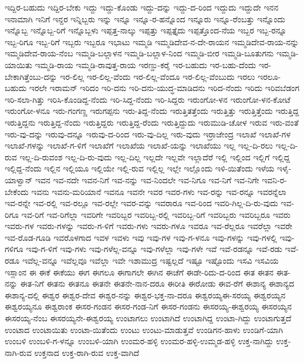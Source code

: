 {ಇದ್ದಿರ-ಬಹುದು
ಇದ್ದಿರ-ಬೇಕು
ಇದ್ದು
ಇದ್ದು-ಕೊಂಡು
ಇದ್ದು-ದನ್ನು
ಇದ್ದು-ದ-ರಿಂದ
ಇದ್ದುದು
ಇದ್ದುದೇ
ಇನನ
ಇನಾಮಾಗಿ
ಇನಿಗೆ
ಇನ್ದರ
ಇನ್ನಿಬ್ಬರು
ಇನ್ನು
ಇನ್ನೂ
ಇನ್ನೂ-ರ-ಹನ್ನೊಂದ
ಇನ್ನೂರು
ಇನ್ನೂ-ರೆಂಬತ್ತು
ಇನ್ನೊಂದು
ಇನ್ನೊಬ್ಬ
ಇನ್ನೊಬ್ಬ-ರಿಗೆ
ಇನ್ನೊಬ್ಬಳು
ಇಪ್ಪತ್ತ-ನಾಲ್ಕು
ಇಪ್ಪತ್ತು
ಇಪ್ಪತ್ತೈದು
ಇಪ್ಪತ್ತೊಂದ-ನೆಯ
ಇಬ್ಬರ
ಇಬ್ಬ-ರನ್ನೂ
ಇಬ್ಬ-ರಿಗೂ
ಇಬ್ಬ-ರಿಗೆ
ಇಬ್ಬರು
ಇಬ್ಬರೂ
ಇಭಾಟು
ಇಮ್ಮಡಿ
ಇಮ್ಮಡಿದೇವ-ನ-ದೇ-ರಾಯನ
ಇಮ್ಮಡಿದೇವ-ರಾಯ-ನನ್ನು
ಇಮ್ಮಡಿದೇವ-ರಾಯ-ನೆಂಬ
ಇಮ್ಮಡಿ-ಬಲ್ಲಾಳನ
ಇಮ್ಮಡಿ-ಬಲ್ಲಾಳ-ನಿಂದ
ಇಮ್ಮಡಿ-ಬೀರ
ಇಮ್ಮಡಿ-ಬೂತುಗನು
ಇಮ್ಮಡಿ-ಯಾಯಿತು
ಇಮ್ಮಡಿ-ರಾಯ
ಇಮ್ಮಡಿ-ರಾವುತ್ತ-ರಾಯ
ಇರಣ್ಡು-ಕರೈ
ಇರ-ಬಹುದು
ಇರ-ಬಹು-ದೆಂದು
ಇರ-ಬೇಕಾಗಿತ್ತೆಂಬು-ದನ್ನು
ಇರ-ಲಿಲ್ಲ
ಇರ-ಲಿಲ್ಲ-ವೆಂದು
ಇರ-ಲಿಲ್ಲ-ವೆಂದೂ
ಇರ-ಲಿಲ್ಲ-ವೆಂಬುದು
ಇರಲು
ಇರಲೂ-ಬಹುದು
ಇರಲೇ
ಇರಾಮನ್
ಇರಿದಂ
ಇರಿ-ದನು
ಇರಿ-ದನು-ಯುದ್ಧ-ಮಾಡಿದನು
ಇರಿದ-ನೆಂದು
ಇರಿದು
ಇರಿವಬೆಡಂಗ
ಇರಿ-ಸಲಾ-ಗಿತ್ತು
ಇರಿಸಿ-ಕೊಂಡಿದ್ದ-ನೆಂದು
ಇರಿ-ಸಿದ್ದ-ನೆಂದು
ಇರಿ-ಸಿದ್ದರು
ಇರುಂಗೋ-ಳನ
ಇರುಂಗೋ-ಳನ-ಕೋಟೆ
ಇರುಂಗೋ-ಳನೂ
ಇರು-ಗಂಗಣ್ಣ
ಇರುಗಪ್ಪನು
ಇರು-ತಿದ್ದ-ನೆಂದು
ಇರುತ್ತಿತತ್ತೆಂದು
ಇರುತ್ತಿತ್ತು
ಇರುತ್ತಿತ್ತೆಂದು
ಇರುತ್ತಿದ್ದ
ಇರುತ್ತಿದ್ದನು
ಇರುತ್ತಿದ್ದ-ನೆಂದು
ಇರುತ್ತಿದ್ದರು
ಇರುತ್ತಿದ್ದ-ರೆಂದು
ಇರುತ್ತಿದ್ದುದು
ಇರುಮುಡಿ-ಚೋಳ
ಇರುವ
ಇರು-ವಂತೆ
ಇರು-ವು-ದನ್ನು
ಇರುವು-ದನ್ನೂ
ಇರುವು-ದ-ರಿಂದ
ಇರು-ವು-ದಿಲ್ಲ
ಇರು-ವುದು
ಇರ್ರಾಜೇಂದ್ರ
ಇಲಾಖೆ
ಇಲಾಖೆ-ಗಳ
ಇಲಾಖೆ-ಗಳನ್ನು
ಇಲಾಖೆ-ಗ-ಳಿಗೆ
ಇಲಾಖೆಗೆ
ಇಲಾಖೆಯ
ಇಲಾಖೆ-ಯನ್ನು
ಇಲಾಖೆಯು
ಇಲ್ಲ
ಇಲ್ಲ-ದಿ-ರಲು
ಇಲ್ಲ-ದಿ-ರುವ
ಇಲ್ಲ-ದಿ-ರುವಂಶ
ಇಲ್ಲ-ದಿ-ರು-ವುದು
ಇಲ್ಲ-ದಿಲ್ಲ
ಇಲ್ಲದೇ
ಇಲ್ಲವೇ
ಇಲ್ಲಾದೆರೆ
ಇಲ್ಲಿ
ಇಲ್ಲಿಂದ
ಇಲ್ಲಿಗೆ
ಇಲ್ಲಿದ್ದ
ಇಲ್ಲಿದ್ದ-ನೆಂದು
ಇಲ್ಲಿನ
ಇಲ್ಲಿಯೂ
ಇಲ್ಲಿಯೇ
ಇಲ್ಲಿ-ರುವ
ಇಲ್ಲಿಲ್ಲ
ಇಲ್ಲೇ
ಇಲ್ಲೊಂದು
ಇಳಿ-ಯಿತೆಂದು
ಇಳೆಯ
ಇಳೈ-ಯಾಳ್ವಾನ್
ಇವನ
ಇವ-ನದೇ
ಇವನ-ನಿಗೆ
ಇವ-ನನ್ನು
ಇವ-ನಿಂದಲೇ
ಇವ-ನಿಗೂ
ಇವ-ನಿಗೆ
ಇವ-ನಿಗೇ
ಇವನಿ-ರ-ಬೇಕೆಂದು
ಇವನು
ಇವನು-ಮರಿಯಾನೆ
ಇವನೂ
ಇವನೇ
ಇವರ
ಇವರ-ಗಳು
ಇವ-ರನ್ನು
ಇವ-ರನ್ನೂ
ಇವರನ್ನೆಲಾ
ಇವ-ರನ್ನೇ
ಇವ-ರಲ್ಲಿ
ಇವ-ರಲ್ಲೂ
ಇವ-ರಲ್ಲೇ
ಇವರ-ವನ್ನು
ಇವರಾರೂ
ಇವ-ರಿಂದ
ಇವರಿ-ಗಿಲ್ಲ-ದಿ-ರು-ವುದು
ಇವ-ರಿಗೂ
ಇವ-ರಿಗೆ
ಇವ-ರಿಗೆಲ್ಲಾ
ಇವರಿಗೇ
ಇವರಿಬ್ಬರ
ಇವರಿಬ್ಬ-ರಲ್ಲಿ
ಇವರಿಬ್ಬ-ರಿಗೆ
ಇವರಿಬ್ಬರು
ಇವರಿಬ್ಬರೂ
ಇವರು
ಇವರು-ಗಳ
ಇವರು-ಗಳನ್ನು
ಇವರು-ಗ-ಳಿಗೆ
ಇವರು-ಗಳು
ಇವರು-ಗಳೂ
ಇವರೂ
ಇವ-ರೆಲ್ಲರೂ
ಇವರೆಲ್ಲಾ
ಇವರೇ
ಇವ-ರೊಡ-ಗೂಡಿ
ಇವರೊಳಗಾದ
ಇವಳ
ಇವಳು
ಇವು
ಇವು-ಗಳ
ಇವು-ಗ-ಳನೂ
ಇವು-ಗಳನ್ನು
ಇವು-ಗಳಲ್ಲಿ
ಇವು-ಗಳಿಗೂ
ಇವು-ಗ-ಳಿಗೆ
ಇವು-ಗಳು
ಇವು-ಗಳೆಲ್ಲ-ವನ್ನೂ
ಇವು-ಗಳೆಲ್ಲಾ
ಇವು-ಗಳೇ
ಇವೆ
ಇವೆ-ರಡನ್ನೂ
ಇವೆ-ರಡು
ಇವೆ-ರಡೂ
ಇವೆಲ್ಲ-ವನ್ನೂ
ಇವೆಲ್ಲವೂ
ಇವೆಲ್ಲಾ
ಇವೇ
ಇಶಾಮುದ್ರ
ಇಷ್ಟಲ್ಲದೆ
ಇಷ್ಟೂ
ಇಷ್ಟೊಂದು
ಇಸವಿ
ಇಸವಿಯ
ಇಸ್ಲಾಂನ
ಈ
ಈಕೆ
ಈಕೆಯು
ಈಗ
ಈಗಲೂ
ಈಗಾಗಲೇ
ಈಗಿನ
ಈಚೆಗೆ
ಈಡೇ-ರಿದು-ದ-ರಿಂದ
ಈತ
ಈತನ
ಈತ-ನನ್ನು
ಈತ-ನಿಗೆ
ಈತನು
ಈತನೂ
ಈತನೇ
ಈತನೇ-ನಾನ-ದರೂ
ಈರೀತಿ
ಈರೋಡು
ಈವ-ರೆಗೆ
ಈಶಾನ್ಯ
ಈಶಾನ್ಯದ
ಈಶಾನ್ಯ-ದಲ್ಲಿ
ಈಶ್ವರ
ಈಶ್ವರ-ದೇವ
ಈಶ್ವರ-ನನ್ನು
ಈಶ್ವರ-ಭಕ್ತ-ನಾ-ದರೂ
ಈಶ್ವರಯ್ಯಈ-ಸರಯ್ಯ
ಈಶ್ವರಯ್ಯನ
ಈಶ್ವರಯ್ಯನೂ
ಈಶ್ವರಾಂಕ
ಈಸರ-ಗಂಡನ
ಈಸರ-ಗಂಡ-ನಿಗೆ
ಈಸರ-ಗಂಡನು
ಈಸರಯ್ಯ-ಈಶ್ವರಯ್ಯ
ಈಸರಯ್ಯನ
ಈಸರಯ್ಯ-ನೆಂಬ
ಈಸರಯ್ಯನೇ-ಈಶ್ವರಯ್ಯ
ಉಂಟಾಗಲು
ಉಂಟಾಗಿದೆ
ಉಂಟಾಗಿದ್ದ
ಉಂಟಾ-ಗಿದ್ದು
ಉಂಟಾಗುತ್ತದೆ
ಉಂಟಾದ
ಉಂಟಾಯಿತು
ಉಂಟಾ-ಯಿತೆಂದು
ಉಂಟು
ಉಂಟು-ಮಾಡುತ್ತವೆ
ಉಂಡಿಗನ-ಹಾಳು
ಉಂಡಿಗೆ-ಯಾಗಿ
ಉಂಬಳಿ
ಉಂಬಳಿ-ಗ-ಳನ್ನೂ
ಉಂಬಳಿ-ಯಾಗಿ
ಉಂಮರ-ಹಳ್ಳಿ
ಉಂಮರ-ಹಳ್ಳಿ-ಉಮ್ಮಡ-ಹಳ್ಳಿ
ಉಕ್ತ-ನಾಗಿದ್ದು
ಉಕ್ತ-ನಾಗಿ-ರುವ
ಉಕ್ತನಾದ
ಉಕ್ತ-ರಾಗಿ-ರುವ
ಉಕ್ತ-ವಾಗಿದೆ
}
